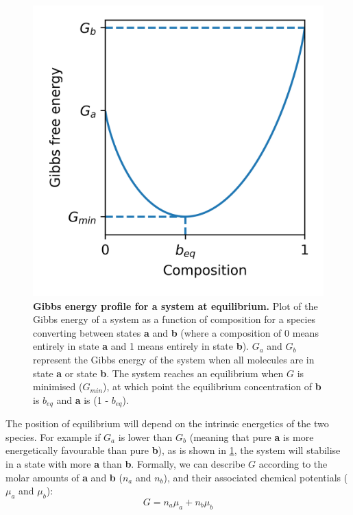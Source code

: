 \documentclass[12pt]{"report"}
\newcommand{\mycaption}[2]{\caption[#1]{\textbf{#1.} #2}}
\begin{document}
\begin{figure}
\includegraphics[scale=0.9]{gibbs_profile}
\mycaption{Gibbs energy profile for a system at equilibrium}{
Plot of the Gibbs energy of a system as a function of composition for a species converting between states \textbf{a} and \textbf{b} (where a composition of 0 means entirely in state \textbf{a} and 1 means entirely in state \textbf{b}). $G_a$ and $G_b$ represent the Gibbs energy of the system when all molecules are in state \textbf{a} or state \textbf{b}. The system reaches an equilibrium when $G$ is minimised ($G_{min}$), at which point the equilibrium concentration of \textbf{b} is $b_{eq}$ and \textbf{a} is (1 - $b_{eq}$).
}
\label{fig:gibbs_profile}
\end{figure}

The position of equilibrium will depend on the intrinsic energetics of the two species. For example if $G_a$ is lower than $G_b$ (meaning that pure \textbf{a} is more energetically favourable than pure \textbf{b}), as is shown in \cref{fig:gibbs_profile}, the system will stabilise in a state with more \textbf{a} than \textbf{b}. Formally, we can describe $G$ according to the molar amounts of \textbf{a} and \textbf{b} ($n_a$ and $n_b$), and their associated chemical potentials ($\mu_a$ and $\mu_b$):
\begin{equation}
G = n_a \mu_a + n_b \mu_b
\label{eq:gibbs}
\end{equation}
\end{document}
